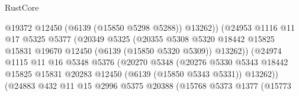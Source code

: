 \begin{lexlean}{RustCore}
\begin{coremodule}
                                          @19372
                                          @12450
                                          (@6139 (@15850 @5298 @5288))
                                          @13262))
                                      (@24953
                                        @1116
                                        @11
                                        @17
                                        @5325
                                        @5377
                                        (@20349
                                          @5325
                                          (@20355
                                            @5308
                                            @5320
                                            @18442
                                            @15825
                                            @15831
                                            @19670
                                            @12450
                                            (@6139 (@15850 @5320 @5309))
                                            @13262))
                                        (@24974
                                          @1115
                                          @11
                                          @16
                                          @5348
                                          @5376
                                          (@20270
                                            @5348
                                            (@20276
                                              @5330
                                              @5343
                                              @18442
                                              @15825
                                              @15831
                                              @20283
                                              @12450
                                              (@6139 (@15850 @5343 @5331))
                                              @13262))
                                          (@24883
                                            @432
                                            @11
                                            @15
                                            @2996
                                            @5375
                                            @20388
                                            (@15768
                                              @5373
                                              @1377
                                              (@15773

\end{coremodule}
\end{lexlean}
